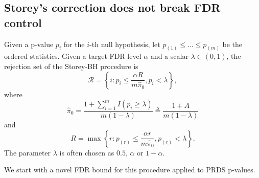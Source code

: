 \documentclass[11pt]{article}
\newcommand{\defeq}{\vcentcolon=}
\def\I{\mathbb{I}}
\begin{document}


\subsection{Storey's correction does not break FDR control}\label{app:storey_BH}
 Given a p-value $p_i$ for the $i$-th null hypothesis, let $p_{(1)}\le \ldots \le p_{(m)}$ be the ordered statistics. Given a target FDR level $\alpha$ and a scalar $\lambda\in (0, 1)$, the rejection set of the Storey-BH procedure is
\[\mathcal{R} = \left\{i: p_i\le \frac{\alpha R}{m\hat{\pi}_0}, p_i < \lambda\right\},\]
where
\[\hat{\pi}_0 = \frac{1 + \sum_{i=1}^{m}I(p_i \ge \lambda)}{m (1 - \lambda)} \triangleq \frac{1 + A}{m(1 - \lambda)}\]
and
\[R = \max\left\{r: p_{(r)}\le \frac{\alpha r}{m\hat{\pi}_0}, p_{(r)} < \lambda\right\}.\]
The parameter $\lambda$ is often chosen as $0.5$, $\alpha$ or $1 - \alpha$.

We start with a novel FDR bound for this procedure applied to PRDS p-values. 
\end{document}
